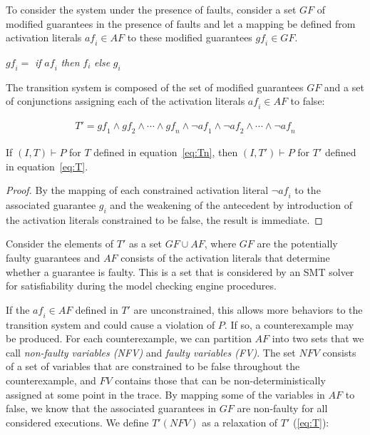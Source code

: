 
To consider the system under the presence of faults, consider a set $GF$ of modified guarantees in the presence of faults and let a mapping be defined from activation literals $\mathit{af_i} \in AF$ to these modified guarantees $\mathit{gf_i} \in GF$. 
\begin{center}
$\mathit{gf_i} =$ \textit{if} $\mathit{af_i}$ \textit{then} $f_i$ \textit{else} $g_i$
\label{eq:sigma}
\end{center}

The transition system is composed of the set of modified guarantees $GF$ and a set of conjunctions assigning each of the activation literals $\mathit{af_i} \in AF$ to false: 

\begin{gather}
T' = \mathit{gf_1} \land \mathit{gf_2} \land \cdots \land \mathit{gf_n} \land \neg \mathit{af_1} \land \neg \mathit{af_2} \land \cdots \land \neg \mathit{af_n}
\label{eq:T}
\end{gather}

\begin{theorem} If $(I,T) \vdash P$ for $T$ defined in equation~\ref{eq:Tn}, then $(I,T') \vdash P$ for $T'$ defined in equation~\ref{eq:T}.
\begin{proof}
By the mapping of each constrained activation literal $\neg \mathit{af_i}$ to the associated guarantee $g_i$ and the weakening of the antecedent by introduction of the activation literals constrained to be false, the result is immediate.
\end{proof}
\end{theorem}

Consider the elements of $T'$ as a set $GF \cup AF$, where $GF$ are the potentially faulty guarantees and $AF$ consists of the activation literals that determine whether a guarantee is faulty. This is a set that is considered by an SMT solver for satisfiability during the model checking engine procedures. 

If the $\mathit{af_i} \in \mathit{AF}$ defined in $T'$ are unconstrained, this allows more behaviors to the transition system and could cause a violation of $P$. If so, a counterexample may be produced. For each counterexample, we can partition $\mathit{AF}$ into two sets that we call {\em non-faulty variables (NFV)} and {\em faulty variables (FV)}.  The set $\mathit{NFV}$ consists of a set of variables that are constrained to be false throughout the counterexample, and $\mathit{FV}$ contains those that can be non-deterministically assigned at some point in the trace. By mapping some of the variables in $\mathit{AF}$ to false, we know that the associated guarantees in $\mathit{GF}$ are non-faulty for all considered executions. We define $T'(\mathit{NFV})$ as a relaxation of $T'$ (\ref{eq:T}):

